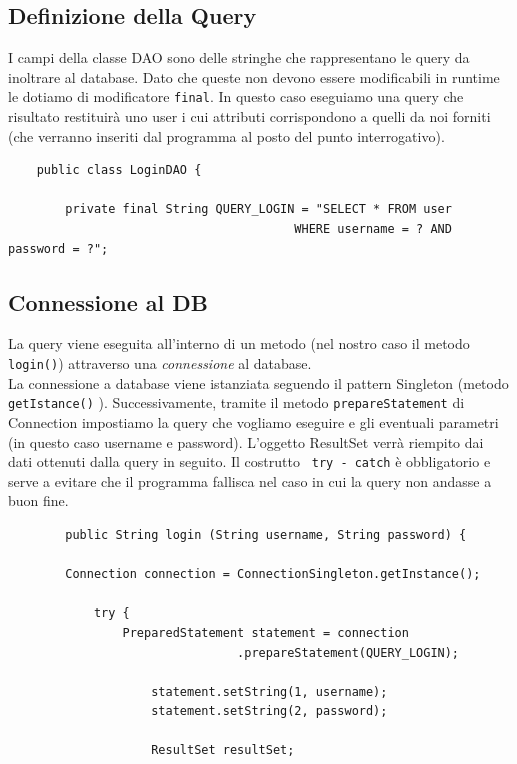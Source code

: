 \documentclass[a4paper,12 pt]{article}
\begin{document}
	\subsection{Definizione della Query}
	I campi della classe DAO sono delle stringhe che rappresentano le query da inoltrare al database. Dato che queste non devono essere modificabili in runtime le dotiamo di modificatore \texttt{final}. In questo caso eseguiamo una query che risultato restituirà uno user i cui attributi corrispondono a quelli da noi forniti (che verranno inseriti dal programma al posto del punto interrogativo).
	\begin{lstlisting}
	public class LoginDAO {
		
		private final String QUERY_LOGIN = "SELECT * FROM user 
										WHERE username = ? AND password = ?";
	\end{lstlisting}
	
	\subsection{Connessione al DB}
	La query viene eseguita all'interno di un metodo (nel nostro caso il metodo \texttt{login()}) attraverso una \textit{connessione} al database.\\
	La connessione a database viene istanziata seguendo il pattern Singleton (metodo \texttt{getIstance()} ). Successivamente, tramite il metodo \texttt{prepareStatement} di Connection impostiamo la query che vogliamo eseguire e gli eventuali parametri (in questo caso username e password). L'oggetto ResultSet verrà riempito dai dati ottenuti dalla query in seguito. Il costrutto \texttt{ try - catch} è obbligatorio e serve a evitare che il programma fallisca nel caso in cui la query non andasse a buon fine.
	
	\begin{lstlisting}
		public String login (String username, String password) {
		
		Connection connection = ConnectionSingleton.getInstance();
			
			try {
				PreparedStatement statement = connection
								.prepareStatement(QUERY_LOGIN);
			
					statement.setString(1, username);
					statement.setString(2, password);
	
					ResultSet resultSet;
	\end{lstlisting}
	
\end{document}
